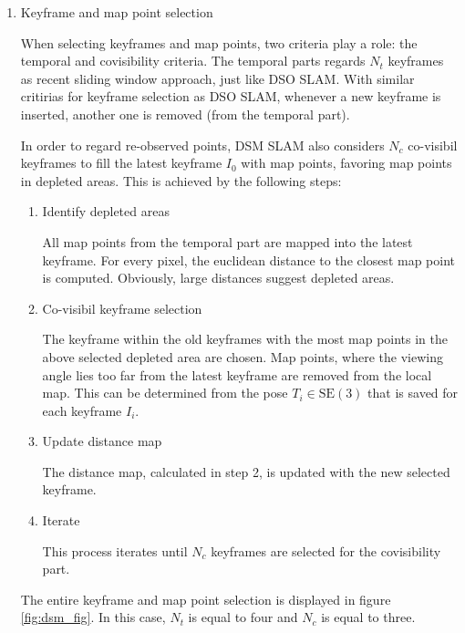 	\begin{enumerate}
	\item{Keyframe and map point selection}
	
	When selecting keyframes and map points, two criteria play a role: the temporal and covisibility criteria. 
	The temporal parts regards $N_t$ keyframes as recent sliding window approach, just like DSO SLAM. With similar 
	critirias for keyframe selection as DSO SLAM, whenever a new keyframe is inserted, another one is removed (from the temporal part).

	In order to regard re-observed points, DSM SLAM also considers $N_c$ co-visibil keyframes to fill the latest keyframe $I_0$ with map points, favoring 
	map points in depleted areas. This is achieved by the following steps: 
	
	\begin{enumerate}
	\item{Identify depleted areas}
	
	All map points from the temporal part are mapped into the latest keyframe. For every pixel, the euclidean distance to the closest map point 
	is computed. Obviously, large distances suggest depleted areas.
	
	\item{Co-visibil keyframe selection}
	
	The keyframe within the old keyframes with the most map points in the above selected depleted area are chosen. Map points, where the viewing angle 
	lies too far from the latest keyframe are removed from the local map. 
	This can be determined from the pose $T_i \in \text{SE}(3)$ that is saved for each keyframe $I_i$. 
	
	\item{Update distance map}
	
	The distance map, calculated in step 2, is updated with the new selected keyframe. 
	
	\item{Iterate}
	
	This process iterates until $N_c$ keyframes are selected for the covisibility part. 
	
	\end{enumerate}
	
	The entire keyframe and map point selection is displayed in figure \ref{fig:dsm_fig}. In this case, $N_t$ is equal to four and $N_c$ is equal to three.
	
	

\end{enumerate}
